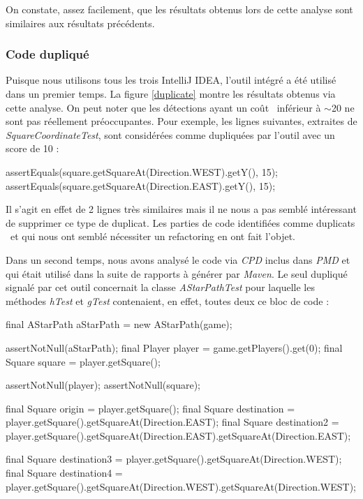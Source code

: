 \documentclass[12pt, openany]{report}
\begin{document}
On constate, assez facilement, que les résultats obtenus lors de cette analyse sont similaires aux résultats précédents.

\newpage





\subsubsection{Code dupliqué}
Puisque nous utilisons tous les trois IntelliJ IDEA, l'outil intégré a été utilisé dans un premier temps. La figure \ref{duplicate} montre les résultats obtenus via cette analyse.
On peut noter que les détections ayant un \og coût \fg \, inférieur à $\sim$20 ne sont pas réellement préoccupantes. Pour exemple, les lignes suivantes, extraites de \textit{SquareCoordinateTest}, sont considérées comme dupliquées par l'outil avec un score de 10 :

\begin{java}
assertEquals(square.getSquareAt(Direction.WEST).getY(), 15);
assertEquals(square.getSquareAt(Direction.EAST).getY(), 15);
\end{java}

Il s'agit en effet de 2 lignes très similaires mais il ne nous a pas semblé intéressant de supprimer ce type de duplicat. 
Les parties de code identifiées comme \og duplicats \fg \, et qui nous ont semblé nécessiter un refactoring en ont fait l'objet.

Dans un second temps, nous avons analysé le code via \textit{CPD} inclus dans \textit{PMD} et qui était utilisé dans la suite de rapports à générer par \textit{Maven}. Le seul dupliqué signalé par cet outil concernait la classe \textit{AStarPathTest} pour laquelle les méthodes \textit{hTest} et \textit{gTest} contenaient, en effet, toutes deux ce bloc de code :

\begin{java}
final AStarPath aStarPath = new AStarPath(game);

assertNotNull(aStarPath);
final Player player = game.getPlayers().get(0);
final Square square = player.getSquare();

assertNotNull(player);
assertNotNull(square);

final Square origin = player.getSquare();
final Square destination = player.getSquare().getSquareAt(Direction.EAST);
final Square destination2 = player.getSquare().getSquareAt(Direction.EAST).getSquareAt(Direction.EAST);

final Square destination3 = player.getSquare().getSquareAt(Direction.WEST);
final Square destination4 = player.getSquare().getSquareAt(Direction.WEST).getSquareAt(Direction.WEST);
\end{java}
\end{document}
